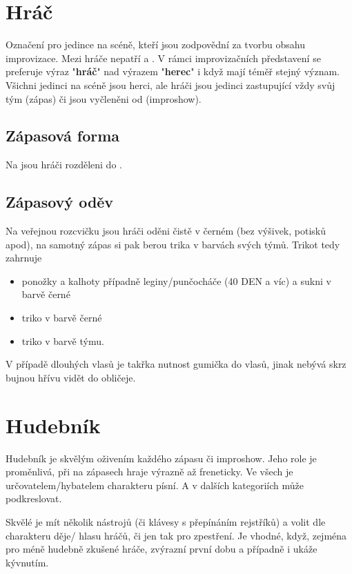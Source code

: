 \needspace{5cm} \section{Hráč} \label{hráč} Označení pro jedince na scéně, kteří jsou zodpovědní za tvorbu obsahu improvizace. Mezi hráče nepatří  a . V rámci improvizačních představení se preferuje výraz "\textbf{hráč}{}"{} nad výrazem "\textbf{herec}{}"{} i když mají téměř stejný význam. Všichni jedinci na scéně jsou herci, ale hráči jsou jedinci zastupující vždy svůj tým (zápas) či jsou vyčleněni od  (improshow).  
 
\subsection{ Zápasová forma } Na  jsou hráči rozděleni do . 
 
\subsection{ Zápasový oděv } Na veřejnou rozcvičku jsou hráči oděni čistě v černém (bez výšivek, potisků apod),  
na samotný zápas si pak berou trika v barvách svých týmů. 
Trikot tedy zahrnuje 
\begin{itemize}
\item ponožky a kalhoty   případně leginy/punčocháče (40 DEN a víc) a sukni v barvě černé
\item triko v barvě černé
\item triko v barvě týmu.
\end{itemize}
V případě dlouhých vlasů je takřka nutnost gumička do vlasů, jinak nebývá skrz bujnou hřívu vidět do obličeje. 
 
 
 
 
 
\needspace{5cm} \section{Hudebník} \label{hudebník} Hudebník je skvělým oživením každého zápasu či improshow. 
Jeho role je proměnlivá, při  na zápasech hraje výrazně až freneticky. 
Ve všech  je určovatelem/hybatelem charakteru písní. 
A v dalších kategoriích může podkreslovat. 
 
Skvělé je mít několik nástrojů (či klávesy s přepínáním rejstříků) a volit dle charakteru děje/ hlasu hráčů, či jen tak pro zpestření. 
Je vhodné, když, zejména pro méně hudebně zkušené hráče, zvýrazní první dobu a případně i ukáže kývnutím. 
 
